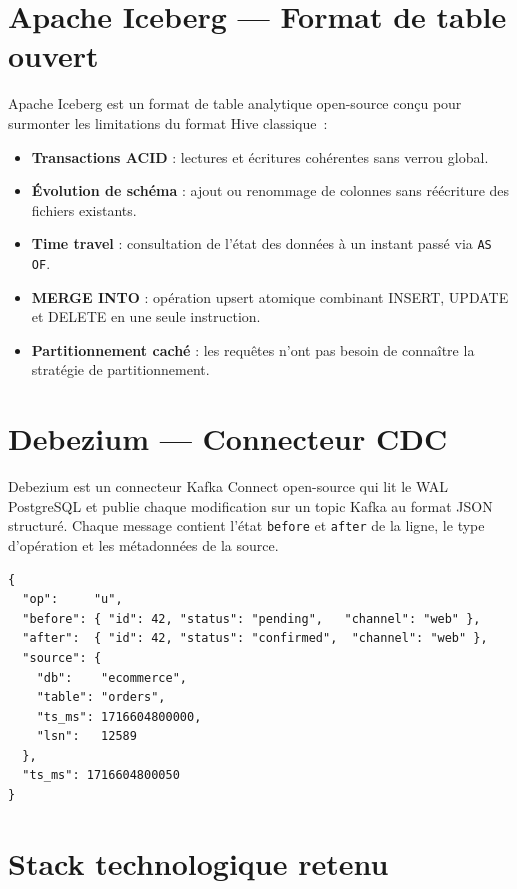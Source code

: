 \documentclass[12pt,a4paper]{report}
\begin{document}
\section{Apache Iceberg --- Format de table ouvert}

Apache Iceberg est un format de table analytique open-source conçu pour
surmonter les limitations du format Hive classique~:

\begin{itemize}
    \item \textbf{Transactions ACID} : lectures et écritures cohérentes sans
          verrou global.
    \item \textbf{Évolution de schéma} : ajout ou renommage de colonnes sans
          réécriture des fichiers existants.
    \item \textbf{Time travel} : consultation de l'état des données à un
          instant passé via \texttt{AS OF}.
    \item \textbf{MERGE INTO} : opération upsert atomique combinant INSERT,
          UPDATE et DELETE en une seule instruction.
    \item \textbf{Partitionnement caché} : les requêtes n'ont pas besoin de
          connaître la stratégie de partitionnement.
\end{itemize}

\section{Debezium --- Connecteur CDC}

Debezium est un connecteur Kafka Connect open-source qui lit le WAL PostgreSQL
et publie chaque modification sur un topic Kafka au format JSON structuré.
Chaque message contient l'état \texttt{before} et \texttt{after} de la ligne,
le type d'opération et les métadonnées de la source.

\begin{lstlisting}[language={},
    caption={Structure d'un message Debezium (opération UPDATE)}]
{
  "op":     "u",
  "before": { "id": 42, "status": "pending",   "channel": "web" },
  "after":  { "id": 42, "status": "confirmed",  "channel": "web" },
  "source": {
    "db":    "ecommerce",
    "table": "orders",
    "ts_ms": 1716604800000,
    "lsn":   12589
  },
  "ts_ms": 1716604800050
}
\end{lstlisting}

\section{Stack technologique retenu}
\end{document}
